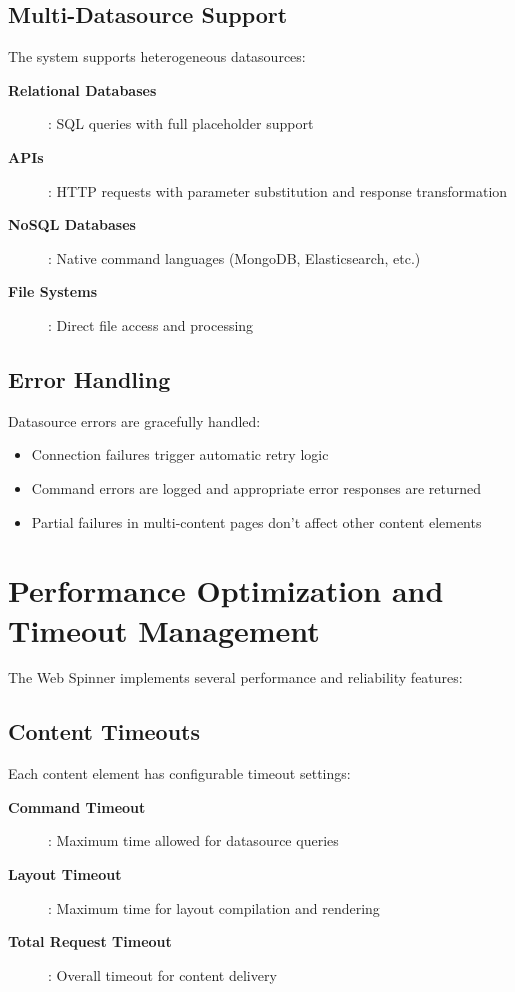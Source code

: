 \subsection{Multi-Datasource Support}

The system supports heterogeneous datasources:

\begin{description}
	\item[\textbf{Relational Databases}]: SQL queries with full \wbpl{} placeholder support
	\item[\textbf{\rest{} APIs}]: HTTP requests with parameter substitution and response transformation
	\item[\textbf{NoSQL Databases}]: Native command languages (MongoDB, Elasticsearch, etc.)
	\item[\textbf{File Systems}]: Direct file access and processing
\end{description}

\subsection{Error Handling}

Datasource errors are gracefully handled:
\begin{itemize}
	\item Connection failures trigger automatic retry logic
	\item Command errors are logged and appropriate error responses are returned
	\item Partial failures in multi-content pages don't affect other content elements
\end{itemize}

\section{Performance Optimization and Timeout Management}
\label{sec:performance-optimization}

The Web Spinner implements several performance and reliability features:

\subsection{Content Timeouts}

Each content element has configurable timeout settings:

\begin{description}
	\item[\textbf{Command Timeout}]: Maximum time allowed for datasource queries
	\item[\textbf{Layout Timeout}]: Maximum time for layout compilation and rendering
	\item[\textbf{Total Request Timeout}]: Overall timeout for content delivery
\end{description}


